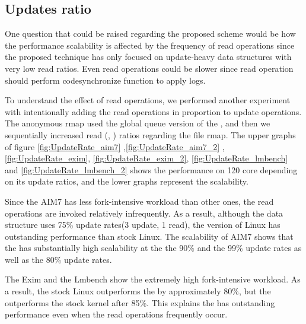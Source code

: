 \subsection{Updates ratio}

One question that could be raised regarding the proposed
\LDU scheme would be how the performance scalability is affected
by the frequency of read operations since the proposed technique
has only focused on update-heavy data structures with very low
read ratios.
Even read operations could be slower since read operation should
perform code{synchronize} function to apply logs.

To understand the effect of read operations, we performed another experiment with intentionally adding the read operations in proportion to update operations.
The anonymous rmap used the global queue version of the \LDU, and then we sequentially increased read (,
) ratios regarding the file rmap.
The upper graphs of figure \ref{fig:UpdateRate_aim7} 
,\ref{fig:UpdateRate_aim7_2} ,  \ref{fig:UpdateRate_exim}, 
\ref{fig:UpdateRate_exim_2},  \ref{fig:UpdateRate_lmbench} and
\ref{fig:UpdateRate_lmbench_2} shows the performance on 120 core depending on
its update ratios, and the lower graphs represent the scalability.

Since the AIM7 has less fork-intensive workload than other ones, the
read operations are invoked relatively infrequently.
As a result, although the data structure uses 75\% update rates(3 update, 1 read), 
the \LDU version of Linux has outstanding performance than stock Linux.
The scalability of AIM7 shows that the \LDU has substantially high scalability at the
the 90\% and the 99\% update rates as well as the 80\% update rates. 

The Exim and the Lmbench show the extremely high fork-intensive workload.
As a result, the stock Linux outperforms the \LDU by approximately
80\%, but the \LDU outperforms the stock kernel after 85\%.
This explains the \LDU has outstanding performance even when the read operations 
frequently occur.
